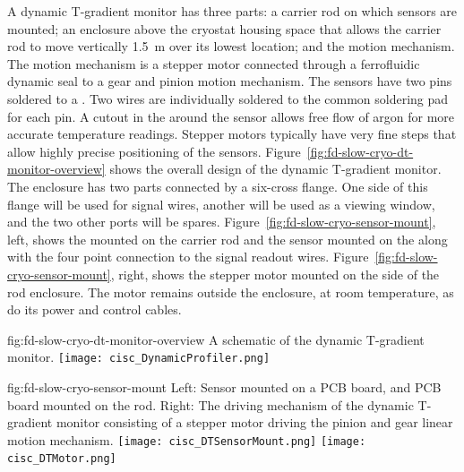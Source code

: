 A dynamic T-gradient monitor has three parts: a carrier rod on which sensors are mounted; an enclosure above the cryostat housing space that allows the carrier rod to move vertically  \SI{1.5}{m} over its lowest location; and the motion mechanism. The motion mechanism is a stepper motor connected through a ferrofluidic dynamic seal to a gear and pinion motion mechanism. The sensors have two pins soldered to a . 
Two wires are individually soldered to the common soldering pad for each pin.  A cutout in the  around the sensor allows free flow of argon for more accurate temperature readings.  Stepper motors typically have very fine steps that allow highly precise positioning of the sensors.  Figure~\ref{fig:fd-slow-cryo-dt-monitor-overview} shows the overall design of the dynamic T-gradient monitor. %
The enclosure has two parts connected by a six-cross flange. One side of this flange will be used for signal wires, another will be used as a viewing window, and the two other ports will be spares. Figure~\ref{fig:fd-slow-cryo-sensor-mount}, left, shows the  mounted on the carrier rod and the sensor mounted on the  along with the four point connection to the signal readout wires. %
Figure~\ref{fig:fd-slow-cryo-sensor-mount}, right, shows the stepper motor mounted on the side of the rod enclosure. The motor remains outside the enclosure, at room temperature, %
as do its power and control cables. %

\begin{dunefigure}{fig:fd-slow-cryo-dt-monitor-overview}
  {%
  A schematic of the dynamic T-gradient monitor.}
 \texttt{[image: cisc\_DynamicProfiler.png]}
\end{dunefigure}
\begin{dunefigure}{fig:fd-slow-cryo-sensor-mount}
  {Left: Sensor mounted on a PCB board, and PCB board mounted on the rod. Right:
    The driving mechanism of the dynamic T-gradient monitor consisting of a stepper motor driving the pinion and gear linear motion mechanism. }
  \texttt{[image: cisc\_DTSensorMount.png]}
  \hspace{3cm}%
  \texttt{[image: cisc\_DTMotor.png]}
\end{dunefigure}

